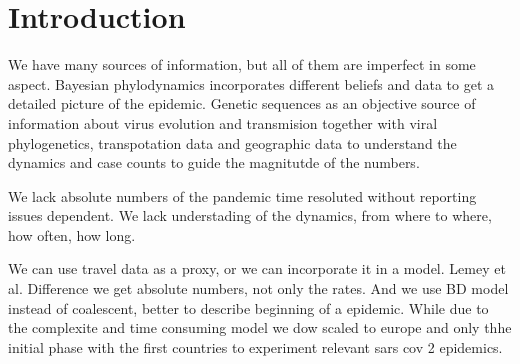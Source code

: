 \chapter{Introduction}

We have many sources of information, but all of them are imperfect in some aspect. Bayesian phylodynamics incorporates different beliefs and data to get a detailed picture of the epidemic. Genetic sequences as an objective source of information about virus evolution and transmision together with viral phylogenetics, transpotation data and geographic data to understand the dynamics and case counts to guide the magnitutde of the numbers.

We lack absolute numbers of the pandemic time resoluted without reporting issues dependent. We lack understading of the dynamics, from where to where, how often, how long.

We can use travel data as a proxy, or we can incorporate it in a model. Lemey et al. Difference we get absolute numbers, not only the rates. And we use BD model instead of coalescent, better to describe beginning of a epidemic. While due to the complexite and time consuming model we dow scaled to europe and only thhe initial phase with the first countries to experiment relevant sars cov 2 epidemics. 

